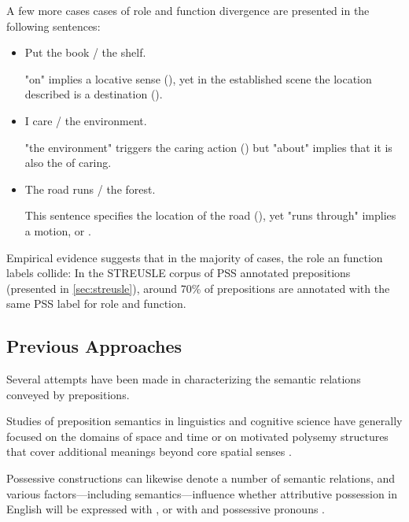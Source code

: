 A few more cases cases of role and function divergence are presented in the following sentences:

\begin{itemize}
    \item Put the book / the shelf.
          
          "on" implies a locative sense (), yet in the established scene the location described is a destination ().
    \item I care / the environment.
          
          "the environment" triggers the caring action () but "about" implies that it is also the  of caring.
    \item The road runs / the forest.
          
          This sentence specifies the location of the road (), yet "runs through" implies a motion, or .
\end{itemize}

Empirical evidence suggests that in the majority of cases, the role an function labels collide: In the STREUSLE corpus of PSS annotated prepositions (presented in \ref{sec:streusle}), around 70\% of prepositions are annotated with the same PSS label for role and function. 

\subsection{Previous Approaches}

Several attempts have been made in characterizing the semantic relations conveyed by prepositions. 

Studies of preposition semantics in linguistics and cognitive science have generally focused on the domains of space and time \citep[e.g.,][]{herskovits-86,bowerman-01,regier-96,khetarpal-09,xu-10,zwarts-00} or on motivated polysemy structures that cover additional meanings beyond core spatial senses \citep{brugman-81,lakoff-87,tyler-03,lindstromberg-10}.


Possessive constructions can likewise denote a number of semantic relations, and various factors---including semantics---influence whether attributive possession in English will be expressed with , or with  and possessive pronouns \citep[the `genitive alternation';][]{taylor-96,nikiforidou-91,rosenbach-02,heine-06,wolk-13,shih-15}.

